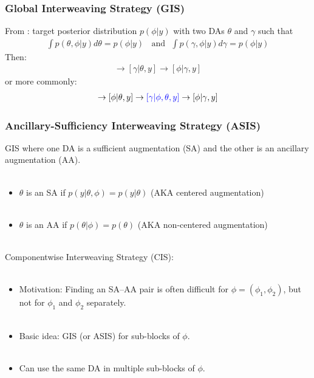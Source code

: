 \documentclass[xcolor=dvipsnames]{beamer}
\begin{document}
\begin{frame}
\frametitle{Global Interweaving Strategy (GIS)}
From \citet{yu2011center}: target posterior distribution $p(\phi|y)$ with two DAs $\theta$ and $\gamma$ such that
\begin{align*}
\int p(\theta,\phi|y) d\theta = p(\phi|y) \ \ \ \ \mbox{and}\ \ \ \int p(\gamma,\phi|y) d\gamma = p(\phi|y) 
\end{align*}
Then:
\begin{align*}
[\theta|\phi,y] \to [\gamma|\theta,y] \to [\phi|\gamma,y]
\end{align*}
or more commonly:
\begin{align*}
[\theta|\phi,y] \to [\phi|\theta,y] \to {\color{blue}[\gamma|\phi,\theta,y]} \to [\phi|\gamma,y]
\end{align*}
\end{frame}

\begin{frame}
\frametitle{Ancillary-Sufficiency Interweaving Strategy (ASIS)}
GIS where one DA is a sufficient augmentation (SA) and the other is an ancillary augmentation (AA).\\~\\
\begin{itemize}
\item$\theta$ is an SA if $p(y|\theta,\phi)=p(y|\theta)$ (AKA centered augmentation)\\~\\
\item$\theta$ is an AA if $p(\theta|\phi)=p(\theta)$ (AKA non-centered augmentation)\\~\\
\end{itemize}
Componentwise Interweaving Strategy (CIS):\\~\\
\begin{itemize}
\item Motivation: Finding an SA--AA pair is often difficult for $\phi=(\phi_1,\phi_2)$, but not for $\phi_1$ and $\phi_2$ separately.\\~\\
\item Basic idea: GIS (or ASIS) for sub-blocks of $\phi$.\\~\\
\item Can use the same DA in multiple sub-blocks of $\phi$.
\end{itemize}
\end{frame}
\end{document}

